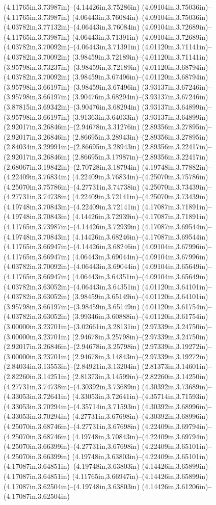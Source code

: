 (4.11765in,3.73987in)--(4.14426in,3.75286in) (4.09104in,3.75036in)--(4.11765in,3.73987in) (4.06443in,3.76084in)--(4.09104in,3.75036in) (4.03782in,3.77132in)--(4.06443in,3.76084in) (4.09104in,3.72689in)--(4.11765in,3.73987in) (4.06443in,3.71391in)--(4.09104in,3.72689in) (4.03782in,3.70092in)--(4.06443in,3.71391in) (4.01120in,3.71141in)--(4.03782in,3.70092in) (3.98459in,3.72189in)--(4.01120in,3.71141in) (3.95798in,3.73237in)--(3.98459in,3.72189in) (4.01120in,3.68794in)--(4.03782in,3.70092in) (3.98459in,3.67496in)--(4.01120in,3.68794in) (3.95798in,3.66197in)--(3.98459in,3.67496in) (3.93137in,3.67246in)--(3.95798in,3.66197in) (3.90476in,3.68294in)--(3.93137in,3.67246in) (3.87815in,3.69342in)--(3.90476in,3.68294in) (3.93137in,3.64899in)--(3.95798in,3.66197in) (3.91363in,3.64033in)--(3.93137in,3.64899in) (2.92017in,3.26846in)--(2.94678in,3.31276in) (2.89356in,3.27895in)--(2.92017in,3.26846in) (2.86695in,3.28943in)--(2.89356in,3.27895in) (2.84034in,3.29991in)--(2.86695in,3.28943in) (2.89356in,3.22417in)--(2.92017in,3.26846in) (2.86695in,3.17987in)--(2.89356in,3.22417in) (2.68067in,3.19842in)--(2.70728in,3.18794in) (4.19748in,3.77882in)--(4.22409in,3.76834in) (4.22409in,3.76834in)--(4.25070in,3.75786in) (4.25070in,3.75786in)--(4.27731in,3.74738in) (4.25070in,3.73439in)--(4.27731in,3.74738in) (4.22409in,3.72141in)--(4.25070in,3.73439in) (4.19748in,3.70843in)--(4.22409in,3.72141in) (4.17087in,3.71891in)--(4.19748in,3.70843in) (4.14426in,3.72939in)--(4.17087in,3.71891in) (4.11765in,3.73987in)--(4.14426in,3.72939in) (4.17087in,3.69544in)--(4.19748in,3.70843in) (4.14426in,3.68246in)--(4.17087in,3.69544in) (4.11765in,3.66947in)--(4.14426in,3.68246in) (4.09104in,3.67996in)--(4.11765in,3.66947in) (4.06443in,3.69044in)--(4.09104in,3.67996in) (4.03782in,3.70092in)--(4.06443in,3.69044in) (4.09104in,3.65649in)--(4.11765in,3.66947in) (4.06443in,3.64351in)--(4.09104in,3.65649in) (4.03782in,3.63052in)--(4.06443in,3.64351in) (4.01120in,3.64101in)--(4.03782in,3.63052in) (3.98459in,3.65149in)--(4.01120in,3.64101in) (3.95798in,3.66197in)--(3.98459in,3.65149in) (4.01120in,3.61754in)--(4.03782in,3.63052in) (3.99346in,3.60888in)--(4.01120in,3.61754in) (3.00000in,3.23701in)--(3.02661in,3.28131in) (2.97339in,3.24750in)--(3.00000in,3.23701in) (2.94678in,3.25798in)--(2.97339in,3.24750in) (2.92017in,3.26846in)--(2.94678in,3.25798in) (2.97339in,3.19272in)--(3.00000in,3.23701in) (2.94678in,3.14843in)--(2.97339in,3.19272in) (2.84034in,3.13553in)--(2.84921in,3.13204in) (2.81373in,3.14601in)--(2.82260in,3.14251in) (2.81373in,3.14599in)--(2.82260in,3.14250in) (4.27731in,3.74738in)--(4.30392in,3.73689in) (4.30392in,3.73689in)--(4.33053in,3.72641in) (4.33053in,3.72641in)--(4.35714in,3.71593in) (4.33053in,3.70294in)--(4.35714in,3.71593in) (4.30392in,3.68996in)--(4.33053in,3.70294in) (4.27731in,3.67698in)--(4.30392in,3.68996in) (4.25070in,3.68746in)--(4.27731in,3.67698in) (4.22409in,3.69794in)--(4.25070in,3.68746in) (4.19748in,3.70843in)--(4.22409in,3.69794in) (4.25070in,3.66399in)--(4.27731in,3.67698in) (4.22409in,3.65101in)--(4.25070in,3.66399in) (4.19748in,3.63803in)--(4.22409in,3.65101in) (4.17087in,3.64851in)--(4.19748in,3.63803in) (4.14426in,3.65899in)--(4.17087in,3.64851in) (4.11765in,3.66947in)--(4.14426in,3.65899in) (4.17087in,3.62504in)--(4.19748in,3.63803in) (4.14426in,3.61206in)--(4.17087in,3.62504in) 